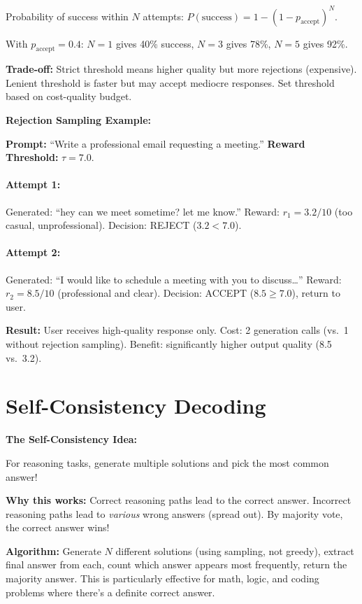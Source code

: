 \begin{chapterenv}
\begin{infobox}
Probability of success within $N$ attempts: $P(\text{success}) = 1 - (1 - p_{\text{accept}})^N$.

With $p_{\text{accept}} = 0.4$: $N=1$ gives 40\% success, $N=3$ gives 78\%, $N=5$ gives 92\%.

\textbf{Trade-off:} Strict threshold means higher quality but more rejections (expensive). Lenient threshold is faster but may accept mediocre responses. Set threshold based on cost-quality budget.
\end{infobox}

\textbf{Rejection Sampling Example:}

\textbf{Prompt:} ``Write a professional email requesting a meeting.'' \textbf{Reward Threshold:} $\tau = 7.0$.

\paragraph{Attempt 1:} Generated: ``hey can we meet sometime? let me know.'' Reward: $r_1 = 3.2/10$ (too casual, unprofessional). Decision: REJECT ($3.2 < 7.0$).

\paragraph{Attempt 2:} Generated: ``I would like to schedule a meeting with you to discuss\ldots'' Reward: $r_2 = 8.5/10$ (professional and clear). Decision: ACCEPT ($8.5 \geq 7.0$), return to user.

\textbf{Result:} User receives high-quality response only. Cost: 2 generation calls (vs.\ 1 without rejection sampling). Benefit: significantly higher output quality (8.5 vs.\ 3.2).

\section{Self-Consistency Decoding}

\begin{infobox}
\textbf{The Self-Consistency Idea:}

For reasoning tasks, generate multiple solutions and pick the most common answer!

\textbf{Why this works:} Correct reasoning paths lead to the correct answer. Incorrect reasoning paths lead to \textit{various} wrong answers (spread out). By majority vote, the correct answer wins!

\textbf{Algorithm:} Generate $N$ different solutions (using sampling, not greedy), extract final answer from each, count which answer appears most frequently, return the majority answer. This is particularly effective for math, logic, and coding problems where there's a definite correct answer.
\end{infobox}


\end{chapterenv}
